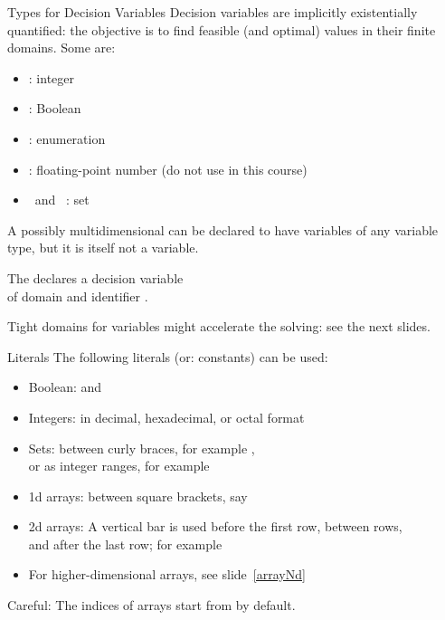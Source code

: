 \documentclass{cons-beamer}
\begin{document}
\begin{flashcardminizinc}
\begin{frame}{Types for Decision Variables}
  Decision variables are implicitly \alert{existentially} quantified:
  the objective is to find feasible (and optimal) values in their
  finite domains.  Some  are:
  \begin{itemize}
  \item {}: integer
  \item {}: Boolean
  \item {}: enumeration
  \item {}: floating-point number \hfill (do
    \alert{not} use in this course)
  \item {} ~and~ : set
  \end{itemize}
  A possibly multidimensional  can be declared to
  have variables of any variable type, but it is itself \alert{not} a
  variable.  \vspace{-1mm} %
  \begin{example}
    The   declares
    a decision variable \\ of domain  and identifier
    .
  \end{example}\vfill
  \alert{Tight domains for variables might accelerate the solving}:
  see the next slides.
\end{frame}

\begin{frame}{Literals}
  The following literals (or: constants) can be used: \vfill
  \begin{itemize}
  \item Boolean:  and  \vfill
  \item Integers: in decimal, hexadecimal, or octal format \vfill
  \item Sets: between curly braces, for example ,
    \\ or as integer ranges, for example  \vfill
  \item 1d arrays: between square brackets, say \mzninline{[6,3,1,7]}
    \vfill
  \item 2d arrays: A vertical bar \mzninlinebar{|} is used before the
    first row, between rows, \\ and after the last row; for example
    \mzninlinebar{[|11,12,13|21,22,23|]} \vfill
  \item For higher-dimensional arrays, see slide~\ref{arrayNd}
  \end{itemize}\vfill
  \alert{Careful: The indices of arrays start from  by
    default.}
\end{frame}


\end{flashcardminizinc}
\end{document}
